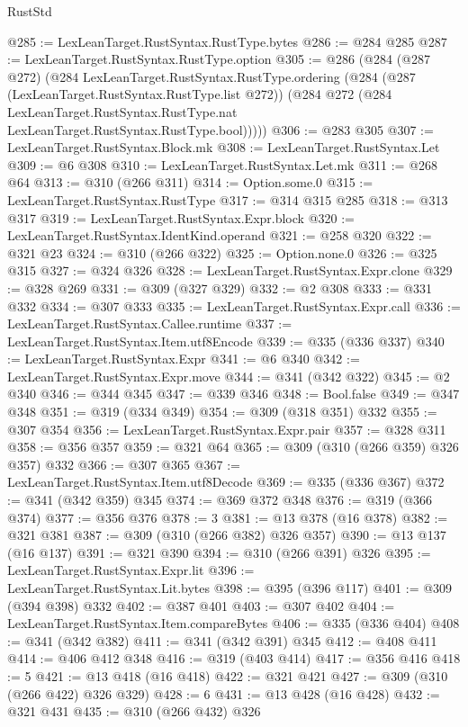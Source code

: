 \begin{lexlean}{RustStd}
\begin{coremodule}
{\begin{coremodule}
{{{{{@285 := LexLeanTarget.RustSyntax.RustType.bytes
@286 := @284 @285
@287 := LexLeanTarget.RustSyntax.RustType.option
@305 := @286
    (@284
      (@287 @272)
      (@284
        LexLeanTarget.RustSyntax.RustType.ordering
        (@284
          (@287 (LexLeanTarget.RustSyntax.RustType.list @272))
          (@284
            @272
            (@284 LexLeanTarget.RustSyntax.RustType.nat LexLeanTarget.RustSyntax.RustType.bool)))))
@306 := @283 @305
@307 := LexLeanTarget.RustSyntax.Block.mk
@308 := LexLeanTarget.RustSyntax.Let
@309 := @6 @308
@310 := LexLeanTarget.RustSyntax.Let.mk
@311 := @268 @64
@313 := @310 (@266 @311)
@314 := Option.some.{0}
@315 := LexLeanTarget.RustSyntax.RustType
@317 := @314 @315 @285
@318 := @313 @317
@319 := LexLeanTarget.RustSyntax.Expr.block
@320 := LexLeanTarget.RustSyntax.IdentKind.operand
@321 := @258 @320
@322 := @321 @23
@324 := @310 (@266 @322)
@325 := Option.none.{0}
@326 := @325 @315
@327 := @324 @326
@328 := LexLeanTarget.RustSyntax.Expr.clone
@329 := @328 @269
@331 := @309 (@327 @329)
@332 := @2 @308
@333 := @331 @332
@334 := @307 @333
@335 := LexLeanTarget.RustSyntax.Expr.call
@336 := LexLeanTarget.RustSyntax.Callee.runtime
@337 := LexLeanTarget.RustSyntax.Item.utf8Encode
@339 := @335 (@336 @337)
@340 := LexLeanTarget.RustSyntax.Expr
@341 := @6 @340
@342 := LexLeanTarget.RustSyntax.Expr.move
@344 := @341 (@342 @322)
@345 := @2 @340
@346 := @344 @345
@347 := @339 @346
@348 := Bool.false
@349 := @347 @348
@351 := @319 (@334 @349)
@354 := @309 (@318 @351) @332
@355 := @307 @354
@356 := LexLeanTarget.RustSyntax.Expr.pair
@357 := @328 @311
@358 := @356 @357
@359 := @321 @64
@365 := @309 (@310 (@266 @359) @326 @357) @332
@366 := @307 @365
@367 := LexLeanTarget.RustSyntax.Item.utf8Decode
@369 := @335 (@336 @367)
@372 := @341 (@342 @359) @345
@374 := @369 @372 @348
@376 := @319 (@366 @374)
@377 := @356 @376
@378 := 3
@381 := @13 @378 (@16 @378)
@382 := @321 @381
@387 := @309 (@310 (@266 @382) @326 @357)
@390 := @13 @137 (@16 @137)
@391 := @321 @390
@394 := @310 (@266 @391) @326
@395 := LexLeanTarget.RustSyntax.Expr.lit
@396 := LexLeanTarget.RustSyntax.Lit.bytes
@398 := @395 (@396 @117)
@401 := @309 (@394 @398) @332
@402 := @387 @401
@403 := @307 @402
@404 := LexLeanTarget.RustSyntax.Item.compareBytes
@406 := @335 (@336 @404)
@408 := @341 (@342 @382)
@411 := @341 (@342 @391) @345
@412 := @408 @411
@414 := @406 @412 @348
@416 := @319 (@403 @414)
@417 := @356 @416
@418 := 5
@421 := @13 @418 (@16 @418)
@422 := @321 @421
@427 := @309 (@310 (@266 @422) @326 @329)
@428 := 6
@431 := @13 @428 (@16 @428)
@432 := @321 @431
@435 := @310 (@266 @432) @326
}}}}}
\end{coremodule}}
\end{coremodule}
\end{lexlean}
